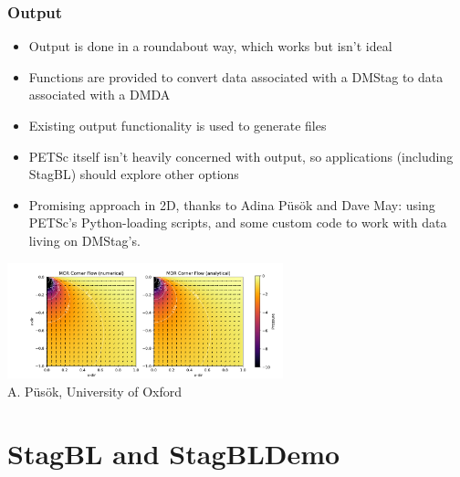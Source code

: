 \documentclass{beamer}
\begin{document}
\begin{frame}[fragile]
\frametitle{Output}
  \begin{itemize}
  \item Output is done in a roundabout way, which works but isn't ideal
  \item Functions are provided to convert data associated with a DMStag to data associated with a DMDA
  \item Existing output functionality is used to generate files
  \item PETSc itself isn't heavily concerned with output, so applications (including StagBL) should explore other options
  \item Promising approach in 2D, thanks to Adina P\"{u}s\"{o}k and Dave May: using PETSc's Python-loading scripts, and some custom code to work with data living on DMStag's.
  \end{itemize}
  \begin{center}
  \includegraphics[width=0.6\textwidth]{images/adina_corner_flow.pdf} \\
  {\tiny A. P\"{u}s\"{o}k, University of Oxford}
  \end{center}
\end{frame}

\section{StagBL and StagBLDemo}
\end{document}
